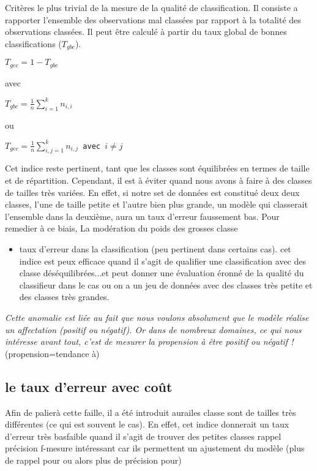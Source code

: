 Critères le plus trivial de la mesure de la qualité de classification.
Il consiste a rapporter l'ensemble des observations mal classées par
rapport à la totalité des observations classées. Il peut être calculé à
partir du taux global de bonnes classifications (\(T_{gbc}\)).

\(T_{gec} = 1 - T_{gbc}\)

avec

\(T_{gbc} = \frac{1} {n}\sum_{i=1}^k n_{i,i}\)

ou

\(T_{gec} = \frac{1} {n}\sum_{i,j=1}^k n_{i,j}\)\texttt{~avec~}\(i \neq j\)

Cet indice reste pertinent, tant que les classes sont équilibrées en
termes de taille et de répartition. Cependant, il est à éviter quand
nous avons à faire à des classes de tailles très variées. En effet, si
notre set de données est constitué deux deux classes, l'une de taille
petite et l'autre bien plus grande, un modèle qui classerait l'ensemble
dans la deuxième, aura un taux d'erreur faussement bas. Pour remedier à
ce biais, La modération du poids des grosses classe

\begin{itemize}
\tightlist
\item
  taux d'erreur dans la classification (peu pertinent dans certains
  cas). cet indice est peux efficace quand il s'agit de qualifier une
  classification avec des classe déséquilibrées...et peut donner une
  évaluation éronné de la qualité du classifieur dans le cas ou on a un
  jeu de données avec des classes très petite et des classes très
  grandes.
\end{itemize}

\emph{Cette anomalie est liée au fait que nous voulons absolument que le
modèle réalise un affectation (positif ou négatif). Or dans de nombreux
domaines, ce qui nous intéresse avant tout, c'est de mesurer la
propension à être positif ou négatif !}(propension=tendance à)

\subsection{le taux d'erreur avec
coût}\label{le-taux-derreur-avec-couxfbt}

Afin de palierà cette faille, il a été introduit aurailes classe sont de
tailles très différentes (ce qui est souvent le cas). En effet, cet
indice donnerait un taux d'erreur très basfaible quand il s'agit de
trouver des petites classes rappel précision f-mesure intéressant car
ils permettent un ajustement du modèle (plus de rappel pour ou alors
plus de précision pour)

